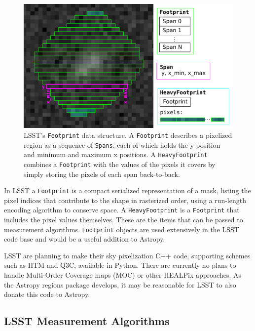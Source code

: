 \documentclass[]{spie}  %
\begin{document}
\begin{figure} [t]
\begin{center}
\includegraphics[width=\textwidth]{footprint}
\end{center}
\caption[footprint]
{\label{fig:footprint}
LSST's \texttt{Footprint} data structure.
A \texttt{Footprint} describes a pixelized region as a sequence of \texttt{Spans}, each of which holds the y position and minimum and maximum x positions.  A \texttt{HeavyFootprint} combines a \texttt{Footprint} with the values of the pixels it covers by simply storing the pixels of each span back-to-back.}
\end{figure}

In LSST a \texttt{Footprint} is a compact serialized representation of a mask, listing the pixel indices that contribute to the shape in rasterized order, using a run-length encoding algorithm to conserve space.
A \texttt{HeavyFootprint} is a \texttt{Footprint} that includes the pixel values themselves.
These are the items that can be passed to measurement algorithms.
\texttt{Footprint} objects are used extensively in the LSST code base and would be a useful addition to Astropy.

LSST are planning to make their sky pixelization C++ code, supporting schemes such as HTM\cite{2001misk.conf..631K} and Q3C\cite{2006ASPC..351..735K}, available in Python.
There are currently no plans to handle Multi-Order Coverage maps (MOC)\cite{2012ASPC..461..347F,2014ivoa.spec.0602F} or other HEALPix approaches\cite{2015A&A...580A.132R}.
As the Astropy regions package develops, it may be reasonable for LSST to also donate this code to Astropy.

\subsection{LSST Measurement Algorithms}
\end{document}
